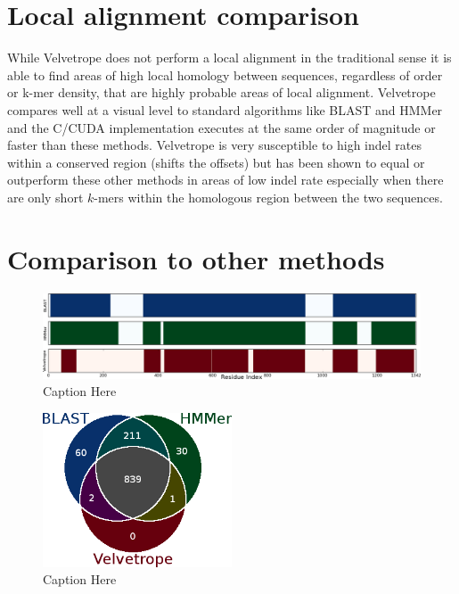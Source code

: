 \documentclass[phd,tocprelim]{cornell}
\begin{document}
\section*{Local alignment comparison}

While Velvetrope does not perform a local alignment in the traditional sense it is able to find areas of high local homology between sequences, regardless of order or k-mer density, that are highly probable areas of local alignment. Velvetrope compares well at a visual level to standard algorithms like BLAST \cite{BLAST} and HMMer \cite{Eddy98} and the C/CUDA implementation executes at the same order of magnitude or faster than these methods. Velvetrope is very susceptible to high indel rates within a conserved region (shifts the offsets) but has been shown to equal or outperform these other methods in areas of low indel rate especially when there are only short $k$-mers within the homologous region between the two sequences.

\section{Comparison to other methods} %
\label{sec:Comparison to other methods}

\begin{figure}[htp]%
 \centerline{\includegraphics[width=\textwidth]{figures/velvetrope/compare6.png}}
 \caption[Velvetrope vs. HMMer and BLAST]{Caption Here}
 	\label{VRcompare1}
 \end{figure}

 \begin{figure}[htp]%
 \centerline{\includegraphics[width=0.5\textwidth]{figures/velvetrope/compare5.png}}
 \caption[Comparison Venn diagram]{Caption Here}
 	\label{VRcompare2}
 \end{figure}
\end{document}
